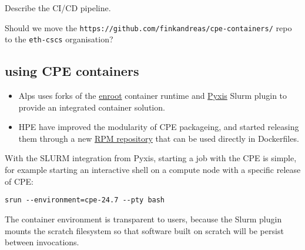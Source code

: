 Describe the CI/CD pipeline.

Should we move the \lstinline{https://github.com/finkandreas/cpe-containers/} repo to the \lstinline{eth-cscs} organisation?

\subsection{using CPE containers}
\label{sec:cpe-container-use}


\begin{itemize}
       \item Alps uses forks of the \href{https://github.com/NVIDIA/enroot}{enroot} container runtime and \href{https://github.com/NVIDIA/pyxis}{Pyxis} Slurm plugin to provide an integrated container solution.
       \item HPE have improved the modularity of CPE packageing, and started releasing them through a new \href{https://cpe.ext.hpe.com/docs/latest/install/installation-guidance-container.html}{RPM repository} that can be used directly in Dockerfiles.
\end{itemize}
With the SLURM integration from Pyxis, starting a job with the CPE is simple, for example starting an interactive shell on a compute node with a specific release of CPE:
\begin{lstlisting}
srun --environment=cpe-24.7 --pty bash
\end{lstlisting}
The container environment is transparent to users, because the Slurm plugin mounts the scratch filesystem so that software built on scratch will be persist between invocations.

